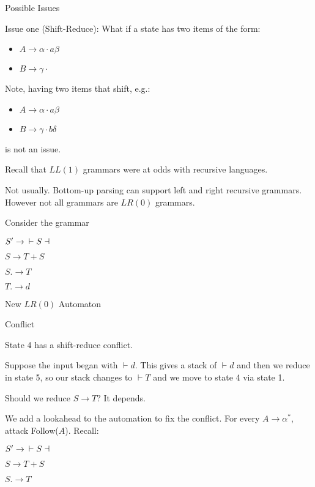 \documentclass{article}
\begin{document}
Possible Issues

Issue one (Shift-Reduce): What if a state has two items of the form: 
\begin{itemize}
    \item \(A \to \alpha \cdot a \beta\)
    \item \(B \to \gamma \cdot\)
\end{itemize}



Note, having two items that shift, e.g.:
\begin{itemize}
    \item \(A \to \alpha \cdot a \beta\)
    \item \(B \to \gamma \cdot b \delta\)
\end{itemize}

is not an issue.


Recall that \(LL(1)\) grammars were at odds with recursive languages.


Not usually. Bottom-up parsing can support left and right recursive
grammars. However not all grammars are \(LR(0)\) grammars.

Consider the grammar

\(S' \to\mkern9mu \vdash S \dashv\)

\(S \to T + S\)

\(S. \to T\)

\(T. \to d\)

New \(LR(0)\) Automaton

Conflict

State 4 has a shift-reduce conflict.

Suppose the input began with \(\vdash d\). This gives a stack of
\(\vdash d\) and then we reduce in state 5, so our stack changes to
\(\vdash T\) and we move to state 4 via state 1.

Should we reduce \(S \to T?\) It depends.

We add a lookahead to the automation to fix the conflict. For every
\(A \to \alpha^*\), attack Follow(\(A\)). Recall:

\(S' \to \mkern9mu\vdash S \dashv\)

\(S \to T + S\)

\(S. \to T\)
\end{document}
